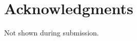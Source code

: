 
\section{Acknowledgments}

Not shown during submission.

\begin{comment}
We would like to thank the many people that made this project possible and
helped us through the process, as this work is the results of many efforts.
We want to specially thank our senior technologists Nilesh Jain and 
Ravi Iyer for their full support and input during the duration of the project.
We want to specially acknowledge Philip Lantz and Vishakha Gupta for their help
with PMGD, key to loading large datasets into VDMS.
We want to thank Jim Blakley for his input during the various 
phases of our project, and for advocating and promoting VDMS.
We want to acknowledge the Intel Labs VDMS team for their efforts
open-sourcing and maintaining the system.
We want to thank Jason Gardner for his helping in setting up many of 
the servers and infrastructure needed to conduct our experiments.
\end{comment}
